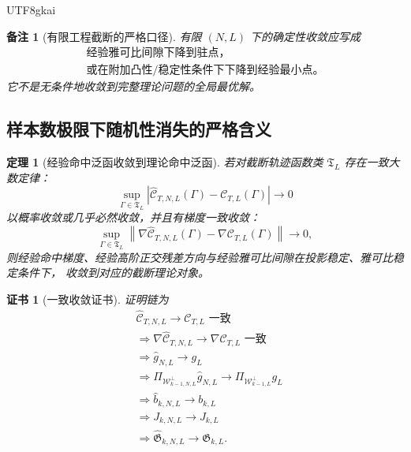 \documentclass[12pt]{article}
\newtheorem{theorem}{定理}[section]
\newtheorem{remark}{备注}[section]
\newtheorem{Certificate}{证书}[section]
\begin{document}
\begin{CJK*}{UTF8}{gkai}
\begin{remark}[有限工程截断的严格口径]
有限 \((N,L)\) 下的确定性收敛应写成
\[
  \boxed{
  \begin{gathered}
  \text{经验雅可比间隙下降到驻点，}\\
  \text{或在附加凸性/稳定性条件下下降到经验最小点。}
  \end{gathered}
  }
\]
它不是无条件地收敛到完整理论问题的全局最优解。
\end{remark}

\subsection{样本数极限下随机性消失的严格含义}
\label{subsec:tex55-engdet-N-limit}

\begin{theorem}[经验命中泛函收敛到理论命中泛函]
\label{thm:tex55-engdet-empirical-to-theory}
若对截断轨迹函数类 \(\mathfrak T_L\) 存在一致大数定律：
\[
  \sup_{\Gamma\in\mathfrak T_L}
  \left|
  \widehat{\mathcal C}_{T,N,L}(\Gamma)
  -
  \mathcal C_{T,L}(\Gamma)
  \right|
  \to0
\]
以概率收敛或几乎必然收敛，并且有梯度一致收敛：
\[
  \sup_{\Gamma\in\mathfrak T_L}
  \left\lVert
  \nabla\widehat{\mathcal C}_{T,N,L}(\Gamma)
  -
  \nabla\mathcal C_{T,L}(\Gamma)
  \right\rVert
  \to0,
\]
则经验命中梯度、经验高阶正交残差方向与经验雅可比间隙在投影稳定、雅可比稳定条件下，
收敛到对应的截断理论对象。
\end{theorem}

\begin{Certificate}[一致收敛证书]
\label{cert:tex55-engdet-empirical-to-theory}
证明链为
\[
\begin{aligned}
  &\widehat{\mathcal C}_{T,N,L}\to\mathcal C_{T,L}
  \text{ 一致}\\
  &\Longrightarrow
  \nabla\widehat{\mathcal C}_{T,N,L}
  \to
  \nabla\mathcal C_{T,L}
  \text{ 一致}\\
  &\Longrightarrow
  \widehat g_{N,L}\to g_L\\
  &\Longrightarrow
  \Pi_{\mathcal W_{k-1,N,L}^{\perp}}\widehat g_{N,L}
  \to
  \Pi_{\mathcal W_{k-1,L}^{\perp}}g_L\\
  &\Longrightarrow
  \widehat b_{k,N,L}\to b_{k,L}\\
  &\Longrightarrow
  J_{k,N,L}\to J_{k,L}\\
  &\Longrightarrow
  \widehat{\mathfrak G}_{k,N,L}\to\mathfrak G_{k,L}.
\end{aligned}
\]
\end{Certificate}


\end{CJK*}
\end{document}

